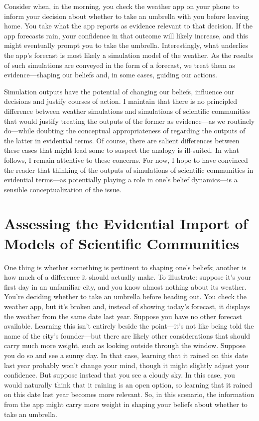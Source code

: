 \documentclass{article}
\begin{document}
Consider when, in the morning, you check the weather app on your phone to inform your decision about whether to take an umbrella with you before leaving home. You take what the app reports as evidence relevant to that decision. If the app forecasts rain, your confidence in that outcome will likely increase, and this might eventually prompt you to take the umbrella. Interestingly, what underlies the app's forecast is most likely a simulation model of the weather. As the results of such simulations are conveyed in the form of a forecast, we treat them as evidence—shaping our beliefs and, in some cases, guiding our actions.

Simulation outputs have the potential of changing our beliefs, influence our decisions and justify courses of action. I maintain that there is no principled difference between weather simulations and simulations of scientific communities that would justify treating the outputs of the former as evidence—as we routinely do—while doubting the conceptual appropriateness of regarding the outputs of the latter in evidential terms. Of course, there are salient differences between these cases that might lead some to suspect the analogy is ill-suited. In what follows, I remain attentive to these concerns. For now, I hope to have convinced the reader that thinking of the outputs of simulations of scientific communities in evidential terms—as potentially playing a role in one's belief dynamics—is a sensible conceptualization of the issue.

\section{Assessing the Evidential Import of Models of Scientific Communities}

One thing is whether something is pertinent to shaping one's beliefs; another is how much of a difference it should actually make. To illustrate: suppose it's your first day in an unfamiliar city, and you know almost nothing about its weather. You're deciding whether to take an umbrella before heading out. You check the weather app, but it's broken and, instead of showing today's forecast, it displays the weather from the same date last year. Suppose you have no other forecast available. Learning this isn't entirely beside the point—it's not like being told the name of the city's founder—but there are likely other considerations that should carry much more weight, such as looking outside through the window. Suppose you do so and see a sunny day. In that case, learning that it rained on this date last year probably won't change your mind, though it might slightly adjust your confidence. But suppose instead that you see a cloudy sky. In this case, you would naturally think that it raining is an open option, so learning that it rained on this date last year becomes more relevant. So, in this scenario, the information from the app might carry more weight in shaping your beliefs about whether to take an umbrella.
\end{document}
